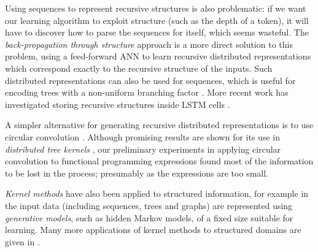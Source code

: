 Using sequences to represent recursive structures is also problematic: if we want our learning algorithm to exploit structure (such as the depth of a token), it will have to discover how to parse the sequences for itself, which seems wasteful. The \emph{back-propagation through structure} approach \citep{goller1996learning} is a more direct solution to this problem, using a feed-forward ANN to learn recursive distributed representations \citep{pollack1990recursive} which correspond exactly to the recursive structure of the inputs. Such distributed representations can also be used for sequences, which is useful for encoding trees with a non-uniform branching factor \citep{kwasny1995tail}. More recent work has investigated storing recursive structures inside LSTM cells \citep{zhu2015long}.

A simpler alternative for generating recursive distributed representations is to use circular convolution \citep{conf/ijcai/Plate91}. Although promising results are shown for its use in \emph{distributed tree kernels} \citep{zanzotto2012distributed}, our preliminary experiments in applying circular convolution to functional programming expressions found most of the information to be lost in the process; presumably as the expressions are too small.

\emph{Kernel methods} have also been applied to structured information, for example in \citep{Gartner2003} the input data (including sequences, trees and graphs) are represented using \emph{generative models}, such as hidden Markov models, of a fixed size suitable for learning. Many more applications of kernel methods to structured domains are given in \citep{bakir2007predicting}.
